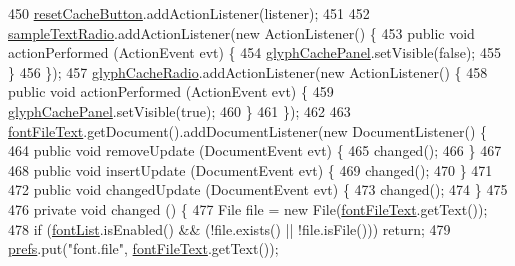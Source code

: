 \begin{DoxyCode}
450         \mbox{\hyperlink{classorg_1_1newdawn_1_1slick_1_1tools_1_1hiero_1_1_hiero_a82573cb24c97cc1e0abe7b5578da0e36}{resetCacheButton}}.addActionListener(listener);
451 
452         \mbox{\hyperlink{classorg_1_1newdawn_1_1slick_1_1tools_1_1hiero_1_1_hiero_ab6178cf8bcd6425842e1b3fd20465e9e}{sampleTextRadio}}.addActionListener(\textcolor{keyword}{new} ActionListener() \{
453             \textcolor{keyword}{public} \textcolor{keywordtype}{void} actionPerformed (ActionEvent evt) \{
454                 \mbox{\hyperlink{classorg_1_1newdawn_1_1slick_1_1tools_1_1hiero_1_1_hiero_a2a248f40f119ae31da5353e42be42662}{glyphCachePanel}}.setVisible(\textcolor{keyword}{false});
455             \}
456         \});
457         \mbox{\hyperlink{classorg_1_1newdawn_1_1slick_1_1tools_1_1hiero_1_1_hiero_a68ef2d71c04ce9de0f557b8ee106f45c}{glyphCacheRadio}}.addActionListener(\textcolor{keyword}{new} ActionListener() \{
458             \textcolor{keyword}{public} \textcolor{keywordtype}{void} actionPerformed (ActionEvent evt) \{
459                 \mbox{\hyperlink{classorg_1_1newdawn_1_1slick_1_1tools_1_1hiero_1_1_hiero_a2a248f40f119ae31da5353e42be42662}{glyphCachePanel}}.setVisible(\textcolor{keyword}{true});
460             \}
461         \});
462 
463         \mbox{\hyperlink{classorg_1_1newdawn_1_1slick_1_1tools_1_1hiero_1_1_hiero_a0711e1f725339751c6784796d43bf97a}{fontFileText}}.getDocument().addDocumentListener(\textcolor{keyword}{new} DocumentListener() \{
464             \textcolor{keyword}{public} \textcolor{keywordtype}{void} removeUpdate (DocumentEvent evt) \{
465                 changed();
466             \}
467 
468             \textcolor{keyword}{public} \textcolor{keywordtype}{void} insertUpdate (DocumentEvent evt) \{
469                 changed();
470             \}
471 
472             \textcolor{keyword}{public} \textcolor{keywordtype}{void} changedUpdate (DocumentEvent evt) \{
473                 changed();
474             \}
475 
476             \textcolor{keyword}{private} \textcolor{keywordtype}{void} changed () \{
477                 File file = \textcolor{keyword}{new} File(\mbox{\hyperlink{classorg_1_1newdawn_1_1slick_1_1tools_1_1hiero_1_1_hiero_a0711e1f725339751c6784796d43bf97a}{fontFileText}}.getText());
478                 \textcolor{keywordflow}{if} (\mbox{\hyperlink{classorg_1_1newdawn_1_1slick_1_1tools_1_1hiero_1_1_hiero_aab47a05761c02f71b369618db21bbb17}{fontList}}.isEnabled() && (!file.exists() || !file.isFile())) \textcolor{keywordflow}{return};
479                 \mbox{\hyperlink{classorg_1_1newdawn_1_1slick_1_1tools_1_1hiero_1_1_hiero_aa7062bea3ffd4639b589cd06000dbfc6}{prefs}}.put(\textcolor{stringliteral}{"font.file"}, \mbox{\hyperlink{classorg_1_1newdawn_1_1slick_1_1tools_1_1hiero_1_1_hiero_a0711e1f725339751c6784796d43bf97a}{fontFileText}}.getText());

\end{DoxyCode}
